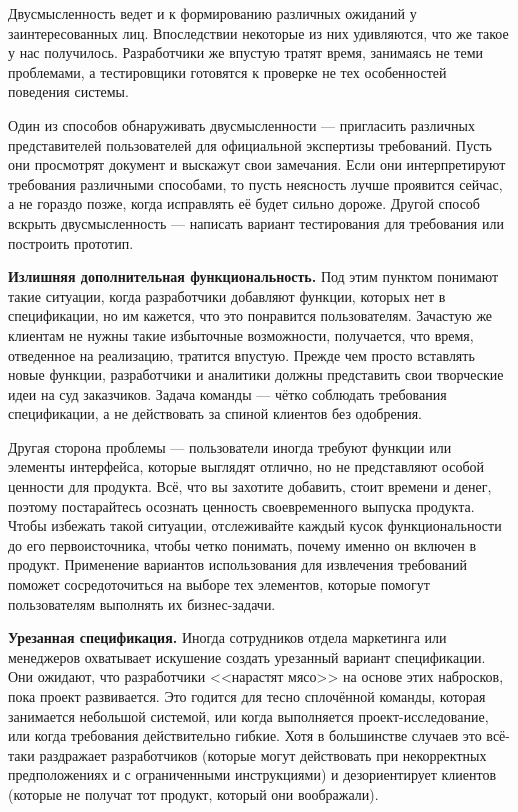 \documentclass{../../text-style}
\begin{document}
Двусмысленность ведет и к формированию различных ожиданий у заинтересованных лиц. Впоследствии некоторые из них удивляются, что же такое у нас получилось. Разработчики же впустую тратят время, занимаясь не теми проблемами, а тестировщики готовятся к проверке не тех особенностей поведения системы.

Один из способов обнаруживать двусмысленности --- пригласить различных представителей пользователей для официальной экспертизы требований. Пусть они просмотрят документ и выскажут свои замечания. Если они интерпретируют требования различными способами, то пусть неясность лучше проявится сейчас, а не гораздо позже, когда исправлять её будет сильно дороже. Другой способ вскрыть двусмысленность --- написать вариант тестирования для требования или построить прототип.

\textbf{Излишняя дополнительная функциональность.} Под этим пунктом понимают такие ситуации, когда разработчики добавляют функции, которых нет в спецификации, но им кажется, что это понравится пользователям. Зачастую же клиентам не нужны такие избыточные возможности, получается, что время, отведенное на реализацию, тратится впустую. Прежде чем просто вставлять новые функции, разработчики и аналитики должны представить свои творческие идеи на суд заказчиков. Задача команды --- чётко соблюдать требования спецификации, а не действовать за спиной клиентов без одобрения.

Другая сторона проблемы --- пользователи иногда требуют функции или элементы интерфейса, которые выглядят отлично, но не представляют особой ценности для продукта. Всё, что вы захотите добавить, стоит времени и денег, поэтому постарайтесь осознать ценность своевременного выпуска продукта. Чтобы избежать такой ситуации, отслеживайте каждый кусок функциональности до его первоисточника, чтобы четко понимать, почему именно он включен в продукт. Применение вариантов использования для извлечения требований поможет сосредоточиться на выборе тех элементов, которые помогут пользователям выполнять их бизнес-задачи.

\textbf{Урезанная спецификация.} Иногда сотрудников отдела маркетинга или менеджеров охватывает искушение создать урезанный вариант спецификации. Они ожидают, что разработчики <<нарастят мясо>> на основе этих набросков, пока проект развивается. Это годится для тесно сплочённой команды, которая занимается небольшой системой, или когда выполняется проект-исследование, или когда требования действительно гибкие. Хотя в большинстве случаев это всё-таки раздражает разработчиков (которые могут действовать при некорректных предположениях и с ограниченными инструкциями) и дезориентирует клиентов (которые не получат тот продукт, который они воображали).
\end{document}
